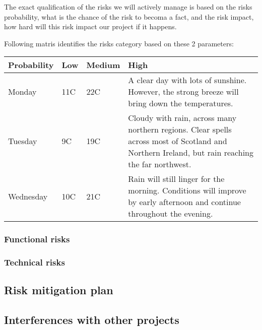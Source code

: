 The exact qualification of the risks we will actively manage is based on the risks probability, what is the chance of the risk to becoma a fact, and the risk impact, how hard will this risk impact our project if it happens.

Following matris identifies the risks category based on these 2 parameters:

\begin{center}
    \begin{tabular}{ | p{2cm} | p{2cm} | p{2cm} | p{2cm} |}
    \hline
    Probability & Low & Medium & High \\ \hline
    Monday & 11C & 22C & A clear day with lots of sunshine.
    However, the strong breeze will bring down the temperatures. \\ \hline
    Tuesday & 9C & 19C & Cloudy with rain, across many northern regions. Clear spells 
    across most of Scotland and Northern Ireland, 
    but rain reaching the far northwest. \\ \hline
    Wednesday & 10C & 21C & Rain will still linger for the morning. 
    Conditions will improve by early afternoon and continue 
    throughout the evening. \\
    \hline
    \end{tabular}
\end{center}

 

\subsubsection{Functional risks}
\lipsum[1]
\subsubsection{Technical risks}
\lipsum[1]
\subsection{Risk mitigation plan}
\lipsum[1]

\subsection{Interferences with other projects}
\lipsum[1]